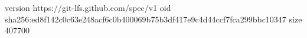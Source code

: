 version https://git-lfs.github.com/spec/v1
oid sha256:ed8f142c0c63e248acf6c0b400069b75b3df417e9c4d44ccf7fca299bbc10347
size 407700
